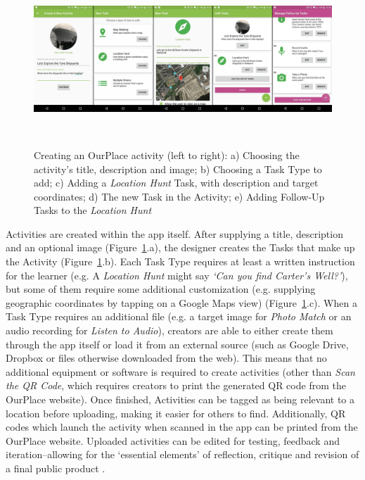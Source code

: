 \documentclass[,hyphens]{sigchi}
\begin{document}
\begin{figure}
  \centering
  \includegraphics[width=2.1\columnwidth]{figures/activityCreation}
  \caption{Creating an OurPlace activity (left to right): a) Choosing the activity's title, description and image; b) Choosing a Task Type to add; c) Adding a \textit{Location Hunt} Task, with description and target coordinates; d) The new Task in the Activity; e) Adding Follow-Up Tasks to the \textit{Location Hunt}  }~\label{fig:ActivityCreation}
\end{figure}

Activities are created within the app itself. After supplying a title, description and an optional image (Figure~\ref{fig:ActivityCreation}.a), the designer creates the Tasks that make up the Activity (Figure~\ref{fig:ActivityCreation}.b). Each Task Type requires at least a written instruction for the learner (e.g. A \textit{Location Hunt} might say \textit{`Can you find Carter's Well?'}), but some of them require some additional customization (e.g. supplying geographic coordinates by tapping on a Google Maps view) (Figure~\ref{fig:ActivityCreation}.c). When a Task Type requires an additional file (e.g. a target image for \textit{Photo Match} or an audio recording for \textit{Listen to Audio}), creators are able to either create them through the app itself or load it from an external source (such as Google Drive, Dropbox or files otherwise downloaded from the web). This means that no additional equipment or software is required to create activities (other than \textit{Scan the QR Code}, which requires creators to print the generated QR code from the OurPlace website). Once finished, Activities can be tagged as being relevant to a location before uploading, making it easier for others to find. Additionally, QR codes which launch the activity when scanned in the app can be printed from the OurPlace website. Uploaded activities can be edited for testing, feedback and iteration--allowing for the `essential elements' of reflection, critique and revision of a final public product \cite{Larmer2015}. 
\end{document}
